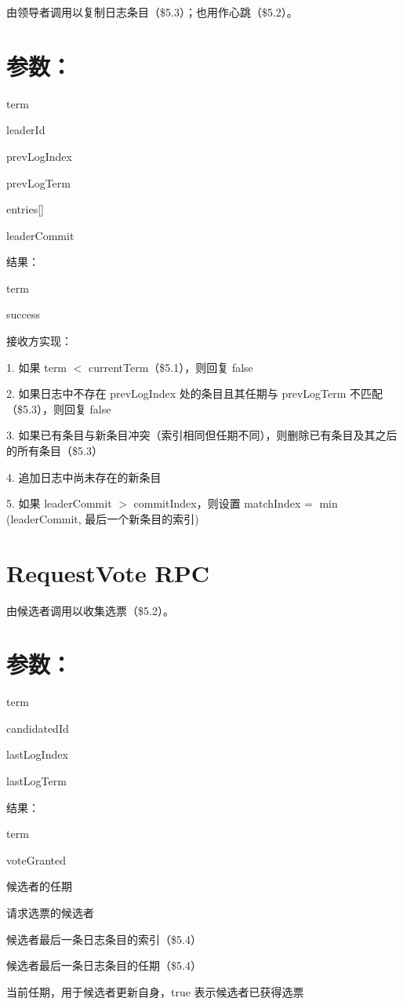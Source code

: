 \documentclass[12pt,a4paper]{report} %
\begin{document}
由领导者调用以复制日志条目（\$5.3）；也用作心跳（\$5.2）。

\section*{参数：}

term

leaderId

prevLogIndex

prevLogTerm

entries[]

leaderCommit

结果：

term

success

接收方实现：

1. 如果 term $<$ currentTerm（\$5.1），则回复 false

2. 如果日志中不存在 prevLogIndex 处的条目且其任期与 prevLogTerm 不匹配（\$5.3），则回复 false

3. 如果已有条目与新条目冲突（索引相同但任期不同），则删除已有条目及其之后的所有条目（\$5.3）

4. 追加日志中尚未存在的新条目

5. 如果 leaderCommit $>$ commitIndex，则设置 matchIndex = $\min$(leaderCommit, 最后一个新条目的索引)

\section*{RequestVote RPC}

由候选者调用以收集选票（\$5.2）。

\section*{参数：}

term

candidatedId

lastLogIndex

lastLogTerm

结果：

term

voteGranted

候选者的任期

请求选票的候选者

候选者最后一条日志条目的索引（\$5.4）

候选者最后一条日志条目的任期（\$5.4）

当前任期，用于候选者更新自身，true 表示候选者已获得选票
\end{document}
